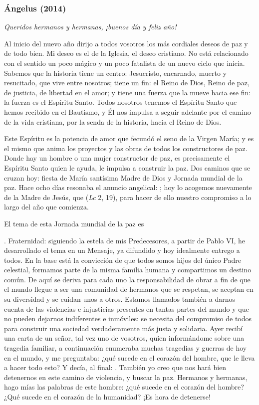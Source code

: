 {\subsubsection{Ángelus (2014)} \emph{Queridos hermanos y hermanas, ¡buenos día y feliz año!}

Al inicio del nuevo año dirijo a todos vosotros los más cordiales deseos de paz y de todo bien. Mi deseo es el de la Iglesia, el deseo cristiano. No está relacionado con el sentido un poco mágico y un poco fatalista de un nuevo ciclo que inicia. Sabemos que la historia tiene un centro: Jesucristo, encarnado, muerto y resucitado, que vive entre nosotros; tiene un fin: el Reino de Dios, Reino de paz, de justicia, de libertad en el amor; y tiene una fuerza que la mueve hacia ese fin: la fuerza es el Espíritu Santo. Todos nosotros tenemos el Espíritu Santo que hemos recibido en el Bautismo, y Él nos impulsa a seguir adelante por el camino de la vida cristiana, por la senda de la historia, hacia el Reino de Dios.

Este Espíritu es la potencia de amor que fecundó el seno de la Virgen María; y es el mismo que anima los proyectos y las obras de todos los constructores de paz. Donde hay un hombre o una mujer constructor de paz, es precisamente el Espíritu Santo quien le ayuda, le impulsa a construir la paz. Dos caminos que se cruzan hoy: fiesta de María santísima Madre de Dios y Jornada mundial de la paz. Hace ocho días resonaba el anuncio angelical: ; hoy lo acogemos nuevamente de la Madre de Jesús, que  (\emph{Lc} 2, 19), para hacer de ello nuestro compromiso a lo largo del año que comienza.

El tema de esta Jornada mundial de la paz es }. Fraternidad: siguiendo la estela de mis Predecesores, a partir de Pablo VI, he desarrollado el tema en un Mensaje, ya difundido y hoy idealmente entrego a todos. En la base está la convicción de que todos somos hijos del único Padre celestial, formamos parte de la misma familia humana y compartimos un destino común. De aquí se deriva para cada uno la responsabilidad de obrar a fin de que el mundo llegue a ser una comunidad de hermanos que se respetan, se aceptan en su diversidad y se cuidan unos a otros. Estamos llamados también a darnos cuenta de las violencias e injusticias presentes en tantas partes del mundo y que no pueden dejarnos indiferentes e inmóviles: se necesita del compromiso de todos para construir una sociedad verdaderamente más justa y solidaria. Ayer recibí una carta de un señor, tal vez uno de vosotros, quien informándome sobre una tragedia familiar, a continuación enumeraba muchas tragedias y guerras de hoy en el mundo, y me preguntaba: ¿qué sucede en el corazón del hombre, que le lleva a hacer todo esto? Y decía, al final: . También yo creo que nos hará bien detenernos en este camino de violencia, y buscar la paz. Hermanos y hermanas, hago mías las palabras de este hombre: ¿qué sucede en el corazón del hombre? ¿Qué sucede en el corazón de la humanidad? ¡Es hora de detenerse!

